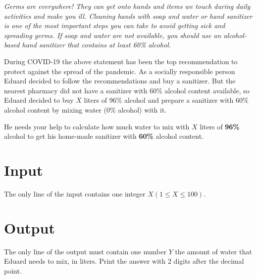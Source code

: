 
\textit{
Germs are everywhere!
They can get onto hands and items we touch during daily activities and make you ill. Cleaning hands with soap and water or hand sanitizer is one of the most important steps you can take to avoid getting sick and spreading germs.
If soap and water are not available, you should use an alcohol-based hand sanitizer that contains at least 60\% alcohol.
}

During COVID-19 the above statement has been the top recommendation to protect against the spread of the pandemic.
As a socially responsible person Eduard decided to follow the recommendations and buy a sanitizer.
But the nearest pharmacy did not have a sanitizer with 60\% alcohol content available, so Eduard decided to buy $X$ liters of 96\% alcohol and prepare a sanitizer with 60\% alcohol content by mixing water (0\% alcohol) with it.

He needs your help to calculate how much water to mix with $X$ liters of \textbf{96\%} alcohol to get his home-made sanitizer with \textbf{60\%} alcohol content.

\section*{Input}
The only line of the input contains one integer $X (1 \leq X \leq 100)$.

\section*{Output}
The only line of the output must contain one number $Y$ the amount of water that Eduard needs to mix, in liters.
Print the answer with 2 digits after the decimal point.
